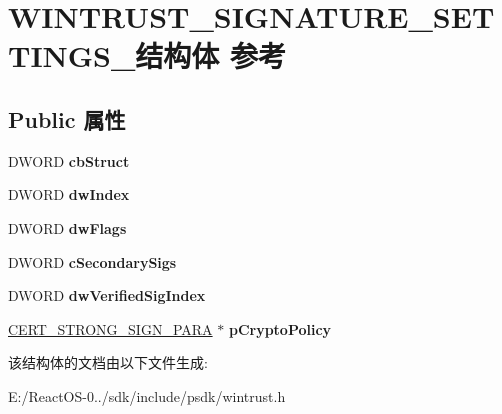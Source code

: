 \hypertarget{struct_w_i_n_t_r_u_s_t___s_i_g_n_a_t_u_r_e___s_e_t_t_i_n_g_s__}{}\section{W\+I\+N\+T\+R\+U\+S\+T\+\_\+\+S\+I\+G\+N\+A\+T\+U\+R\+E\+\_\+\+S\+E\+T\+T\+I\+N\+G\+S\+\_\+结构体 参考}
\label{struct_w_i_n_t_r_u_s_t___s_i_g_n_a_t_u_r_e___s_e_t_t_i_n_g_s__}
\subsection*{Public 属性}
\begin{DoxyCompactItemize}
\item 
\mbox{\label{struct_w_i_n_t_r_u_s_t___s_i_g_n_a_t_u_r_e___s_e_t_t_i_n_g_s___ad6678beebdbce7b41aa6dd974ea6c624}} 
D\+W\+O\+RD {\bfseries cb\+Struct}
\item 
\mbox{\label{struct_w_i_n_t_r_u_s_t___s_i_g_n_a_t_u_r_e___s_e_t_t_i_n_g_s___ae2209ec5c861ab2ff9a12d13c04d9862}} 
D\+W\+O\+RD {\bfseries dw\+Index}
\item 
\mbox{\label{struct_w_i_n_t_r_u_s_t___s_i_g_n_a_t_u_r_e___s_e_t_t_i_n_g_s___adb8d6bcc5cfc1e053d4366fa9527f542}} 
D\+W\+O\+RD {\bfseries dw\+Flags}
\item 
\mbox{\label{struct_w_i_n_t_r_u_s_t___s_i_g_n_a_t_u_r_e___s_e_t_t_i_n_g_s___a27f633ec50cbe1a43472ef8a56ba9927}} 
D\+W\+O\+RD {\bfseries c\+Secondary\+Sigs}
\item 
\mbox{\label{struct_w_i_n_t_r_u_s_t___s_i_g_n_a_t_u_r_e___s_e_t_t_i_n_g_s___a3b87b69246a01fbd7256468d19866050}} 
D\+W\+O\+RD {\bfseries dw\+Verified\+Sig\+Index}
\item 
\mbox{\label{struct_w_i_n_t_r_u_s_t___s_i_g_n_a_t_u_r_e___s_e_t_t_i_n_g_s___a2c18cbddf71bb6828c7a0b3ea791d85b}} 
\hyperlink{struct___c_e_r_t___s_t_r_o_n_g___s_i_g_n___p_a_r_a}{C\+E\+R\+T\+\_\+\+S\+T\+R\+O\+N\+G\+\_\+\+S\+I\+G\+N\+\_\+\+P\+A\+RA} $\ast$ {\bfseries p\+Crypto\+Policy}
\end{DoxyCompactItemize}


该结构体的文档由以下文件生成\+:\begin{DoxyCompactItemize}
\item 
E\+:/\+React\+O\+S-\/0../sdk/include/psdk/wintrust.\+h\end{DoxyCompactItemize}
